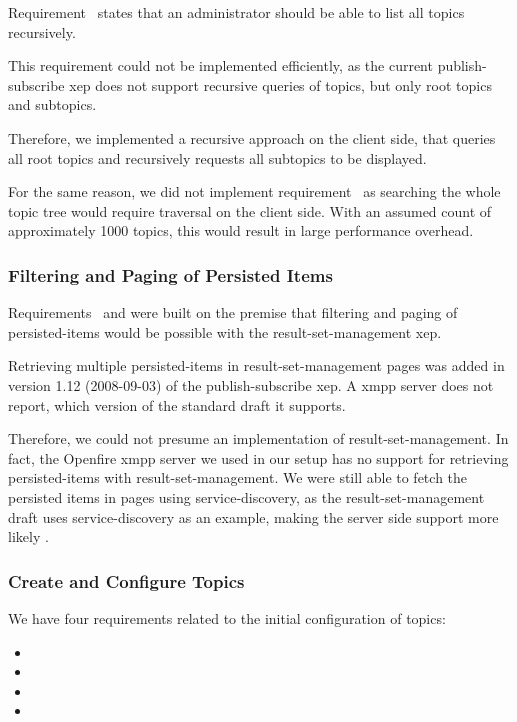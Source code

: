 Requirement~ states that an administrator should be able to list all topics recursively.

This requirement could not be implemented efficiently, as the current \gls{publish-subscribe} \gls{xep} does not support recursive queries of \glspl{topic}, but only root \glspl{topic} and subtopics.

Therefore, we implemented a recursive approach on the client side, that queries all root \glspl{topic} and recursively requests all subtopics to be displayed.

For the same reason, we did not implement requirement~ as searching the whole \gls{topic} tree would require traversal on the client side.
With an assumed count of approximately 1000 \glspl{topic}, this would result in large performance overhead.

\subsubsection{Filtering and Paging of Persisted Items}

Requirements~ and  were built on the premise that filtering and paging of \glspl{persisted-item} would be possible with the \gls{result-set-management} \gls{xep}.

Retrieving multiple \glspl{persisted-item} in \gls{result-set-management} pages was added in version 1.12 (2008-09-03) of the \gls{publish-subscribe} \gls{xep}.
A \gls{xmpp} server does not report, which version of the standard draft it supports.

Therefore, we could not presume an implementation of \gls{result-set-management}.
In fact, the Openfire \gls{xmpp} server we used in our setup has no support for retrieving \glspl{persisted-item} with \gls{result-set-management}. We were still able to fetch the persisted items in pages using \gls{service-discovery}, as the \gls{result-set-management} draft uses service-discovery as an example, making the server side support more likely \cite{xep-0059}.

\subsubsection{Create and Configure Topics}

We have four requirements related to the initial configuration of \glspl{topic}:
\begin{itemize}
  \item {}
  \item {}
  \item {}
  \item {}
\end{itemize}

